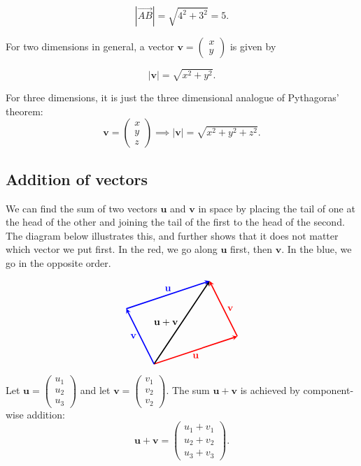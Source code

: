 \documentclass[a4paper,12pt]{amsart}
\begin{document}
    \[ \left| \vec{AB} \right| = \sqrt{4^2 + 3^2} = 5. \]

    For two dimensions in general, a vector $\textbf{v} = \begin{pmatrix} x \\ y \end{pmatrix}$ is given by

    \[ \left| \mathbf{v} \right| = \sqrt{x^2 + y^2}. \]

    For three dimensions, it is just the three dimensional analogue of Pythagoras' theorem:
    \[ \mathbf{v} = \begin{pmatrix} x \\ y \\ z \end{pmatrix} \implies \left| \mathbf{v} \right| = \sqrt{x^2 + y^2 + z^2}. \]

    \subsection{Addition of vectors}

    We can find the sum of two vectors $\mathbf{u}$ and $\mathbf{v}$ in space by placing the tail of one at the head of the other and joining the tail of the first to the head of the second. The diagram below illustrates this, and further shows that it does not matter which vector we put first. In the red, we go along $\mathbf{u}$ first, then $\mathbf{v}$.  In the blue, we go in the opposite order.

    \[
        \begin{tikzpicture}[vector/.style={-stealth,very thick}]
            \coordinate (A) at (0,0);
            \coordinate (B) at (3,1);
            \coordinate (C) at (2,3);
            \coordinate (D) at (-1,2);
            \draw[vector, red] (A) -- (B) node[midway, below] {$\mathbf{u}$}; 
            \draw[vector, red] (B) -- (C) node[midway, right] {$\mathbf{v}$};
            \draw[vector] (A) -- (C) node[midway, left] {$\mathbf{u} + \mathbf{v}$};
            \draw[vector, blue] (A) -- (D) node[midway, left] {$\mathbf{v}$};
            \draw[vector, blue] (D) -- (C) node[midway, above] {$\mathbf{u}$};
        \end{tikzpicture}
    \]

    Let $\mathbf{u} = \begin{pmatrix} u_1 \\ u_2 \\ u_3 \end{pmatrix}$ and let $\mathbf{v} = \begin{pmatrix} v_1 \\ v_2 \\ v_2 \end{pmatrix}$. The sum $\mathbf{u} + \mathbf{v}$ is achieved by component-wise addition:
    \[ \mathbf{u} + \mathbf{v} = \begin{pmatrix} u_1 + v_1 \\ u_2 + v_2 \\ u_3 + v_3 \end{pmatrix}. \]
\end{document}
